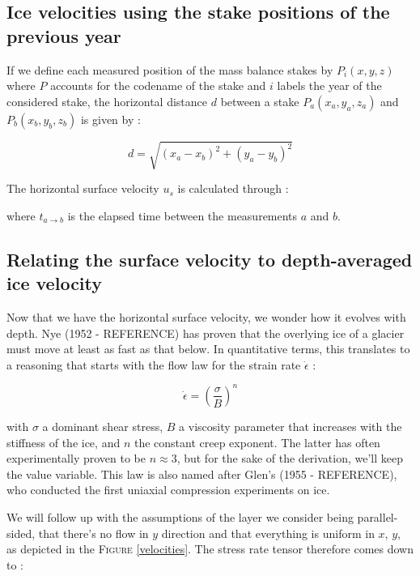 \subsection*{Ice velocities using the stake positions of the previous year}

If we define each measured position of the mass balance stakes by $P_i(x,y,z)$ where $P$ accounts for the codename of the stake and $i$ labels the year of the considered stake, the horizontal distance $d$ between a stake $P_a(x_a, y_a, z_a)$ and $P_b(x_b, y_b, z_b)$ is given by :

\begin{equation}d = \sqrt{(x_a - x_b)^2 + (y_a - y_b)^2}\end{equation}

The horizontal surface velocity $u_s$ is calculated through :

\begin{center}
\end{center}

where $t_{a \rightarrow b}$ is the elapsed time between the measurements $a$ and $b$.


\subsection*{Relating the surface velocity to depth-averaged ice velocity}

Now that we have the horizontal surface velocity, we wonder how it evolves with depth. Nye (1952 - REFERENCE) has proven that the overlying ice of a glacier must move at least as fast as that below. In quantitative terms, this translates to a reasoning that starts with the flow law for the strain rate $\dot{\epsilon}$ :

\begin{equation}\dot{\epsilon} = \left( \frac{\sigma}{B} \right)^n\end{equation}

with $\sigma$ a dominant shear stress, $B$ a viscosity parameter that increases with the stiffness of the ice, and $n$ the constant creep exponent. The latter has often experimentally proven to be $n \approx 3$, but for the sake of the derivation, we'll keep the value variable.
This law is also named after Glen's (1955 - REFERENCE), who conducted the first uniaxial compression experiments on ice.

We will follow up with the assumptions of the layer we consider being parallel-sided, that there's no flow in $y$ direction and that everything is uniform in $x$, $y$, as depicted in the \textsc{Figure} \ref{velocities}. The stress rate tensor therefore comes down to :


